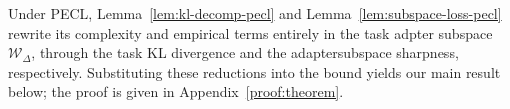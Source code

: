 \documentclass{article}
\theoremstyle{plain}
\theoremstyle{definition}
\theoremstyle{remark}
\begin{document}














Under PECL, Lemma~\ref{lem:kl-decomp-pecl} and Lemma~\ref{lem:subspace-loss-pecl} rewrite its complexity and empirical terms entirely in the task adpter subspace $\mathcal W_\Delta$, through the task KL divergence and the adaptersubspace sharpness, respectively. 
Substituting these reductions into the bound yields our main result below; the proof is given in Appendix~\ref{proof:theorem}.
\end{document}
